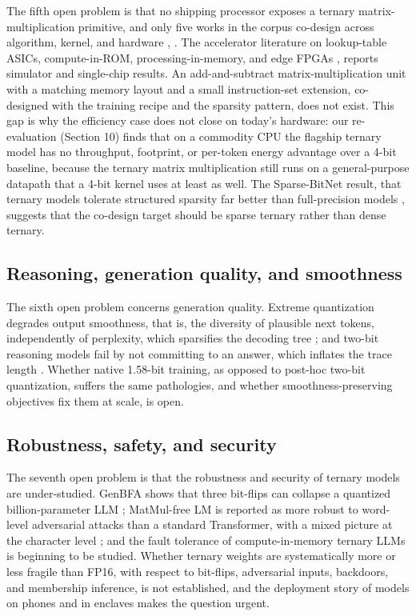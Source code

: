 \documentclass[11pt]{article}
\begin{document}
The fifth open problem is that no shipping processor exposes a ternary
matrix-multiplication primitive, and only five works in the corpus co-design across
algorithm, kernel, and hardware \cite{Ma2024-BitNetB158,Ma2025-BitNet2B4T},
\cite{Zhu2024-MatmulFree,Zhang2026-SparseBitNet,Ji2024-BMTBAT}. The accelerator
literature on lookup-table ASICs, compute-in-ROM, processing-in-memory, and edge FPGAs
\cite{Shan2025-Platinum,Guan2026-TOM,Malekar2025-PIMLLM,Qiao2025-TeLLMev2},
\cite{Lin2026-VitaLLM,Zhang2025-PDSwap} reports simulator and single-chip results. An add-and-subtract matrix-multiplication unit with a
matching memory layout and a small instruction-set extension, co-designed with the
training recipe and the sparsity pattern, does not exist. This gap is why the efficiency
case does not close on today's hardware: our re-evaluation (Section 10) finds that on a
commodity CPU the flagship ternary model has no throughput, footprint, or per-token
energy advantage over a 4-bit baseline, because the ternary matrix multiplication still
runs on a general-purpose datapath that a 4-bit kernel uses at least as well. The Sparse-BitNet
result, that ternary models tolerate structured sparsity far better than full-precision
models \cite{Zhang2026-SparseBitNet}, suggests that the co-design target should be sparse
ternary rather than dense ternary.

\subsection{Reasoning, generation quality, and smoothness}

The sixth open problem concerns generation quality. Extreme quantization degrades output
smoothness, that is, the diversity of plausible next tokens, independently of
perplexity, which sparsifies the decoding tree \cite{Xu2026-FittingNotEnough}; and two-bit
reasoning models fail by not committing to an answer, which inflates the trace length
\cite{Alimaskina2026-ExtremeReasoning}. Whether native 1.58-bit training, as opposed to
post-hoc two-bit quantization, suffers the same pathologies, and whether
smoothness-preserving objectives fix them at scale, is open.

\subsection{Robustness, safety, and security}

The seventh open problem is that the robustness and security of ternary models are
under-studied. GenBFA shows that three bit-flips can collapse a quantized
billion-parameter LLM \cite{Das2024-GenBFA}; MatMul-free LM is reported as more robust to
word-level adversarial attacks than a standard Transformer, with a mixed picture at the
character level \cite{Fan2024-ResilientEfficient}; and the
fault tolerance of compute-in-memory ternary LLMs is beginning to be studied. Whether
ternary weights are systematically more or less fragile than FP16, with respect to
bit-flips, adversarial inputs, backdoors, and membership inference, is not established,
and the deployment story of models on phones and in enclaves makes the question urgent.
\end{document}
